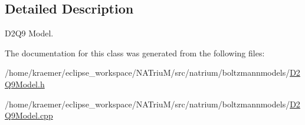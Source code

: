 \subsection{Detailed Description}
D2\-Q9 Model. 

The documentation for this class was generated from the following files\-:\begin{DoxyCompactItemize}
\item 
/home/kraemer/eclipse\-\_\-workspace/\-N\-A\-Triu\-M/src/natrium/boltzmannmodels/\hyperlink{D2Q9Model_8h}{D2\-Q9\-Model.\-h}\item 
/home/kraemer/eclipse\-\_\-workspace/\-N\-A\-Triu\-M/src/natrium/boltzmannmodels/\hyperlink{D2Q9Model_8cpp}{D2\-Q9\-Model.\-cpp}\end{DoxyCompactItemize}
